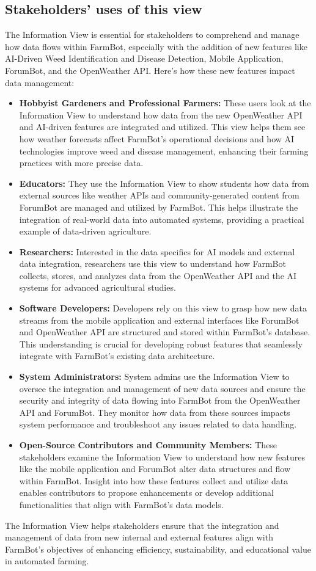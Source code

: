 \subsection{Stakeholders’ uses of this view}
The Information View is essential for stakeholders to comprehend and manage how data flows within FarmBot, especially with the addition of new features like AI-Driven Weed Identification and Disease Detection, Mobile Application, ForumBot, and the OpenWeather API. Here's how these new features impact data management:
\begin{itemize}
    \item \textbf{Hobbyist Gardeners and Professional Farmers:} These users look at the Information View to understand how data from the new OpenWeather API and AI-driven features are integrated and utilized. This view helps them see how weather forecasts affect FarmBot's operational decisions and how AI technologies improve weed and disease management, enhancing their farming practices with more precise data.
    \item \textbf{Educators:} They use the Information View to show students how data from external sources like weather APIs and community-generated content from ForumBot are managed and utilized by FarmBot. This helps illustrate the integration of real-world data into automated systems, providing a practical example of data-driven agriculture.
    \item \textbf{Researchers:} Interested in the data specifics for AI models and external data integration, researchers use this view to understand how FarmBot collects, stores, and analyzes data from the OpenWeather API and the AI systems for advanced agricultural studies.
    \item \textbf{Software Developers:} Developers rely on this view to grasp how new data streams from the mobile application and external interfaces like ForumBot and OpenWeather API are structured and stored within FarmBot’s database. This understanding is crucial for developing robust features that seamlessly integrate with FarmBot’s existing data architecture.
    \item \textbf{System Administrators:} System admins use the Information View to oversee the integration and management of new data sources and ensure the security and integrity of data flowing into FarmBot from the OpenWeather API and ForumBot. They monitor how data from these sources impacts system performance and troubleshoot any issues related to data handling.
    \item \textbf{Open-Source Contributors and Community Members:} These stakeholders examine the Information View to understand how new features like the mobile application and ForumBot alter data structures and flow within FarmBot. Insight into how these features collect and utilize data enables contributors to propose enhancements or develop additional functionalities that align with FarmBot’s data models.
\end{itemize}
The Information View helps stakeholders ensure that the integration and management of data from new internal and external features align with FarmBot's objectives of enhancing efficiency, sustainability, and educational value in automated farming.

